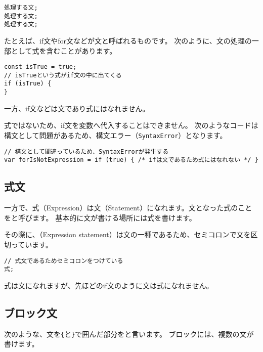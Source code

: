 \begin{lstlisting}
処理する文;
処理する文;
処理する文;
\end{lstlisting}

たとえば、if文やfor文などが文と呼ばれるものです。
次のように、文の処理の一部として式を含むことがあります。

\begin{lstlisting}
const isTrue = true;
// isTrueという式がif文の中に出てくる
if (isTrue) {
}
\end{lstlisting}

一方、if文などは文であり式にはなれません。

式ではないため、if文を変数へ代入することはできません。
次のようなコードは構文として問題があるため、構文エラー（\texttt{SyntaxError}）となります。

\begin{lstlisting}
// 構文として間違っているため、SyntaxErrorが発生する
var forIsNotExpression = if (true) { /* ifは文であるため式にはなれない */ }
\end{lstlisting}

\hypertarget{expression-statement}{%
\subsection{式文}\label{expression-statement}}

一方で、式（Expression）は文（Statement）になれます。文となった式のことを\textbf{}と呼びます。
基本的に文が書ける場所には式を書けます。

その際に、\textbf{}（Expression
statement）は文の一種であるため、セミコロンで文を区切っています。

\begin{lstlisting}
// 式文であるためセミコロンをつけている
式;
\end{lstlisting}

式は文になれますが、先ほどのif文のように文は式になれません。

\hypertarget{block-statement}{%
\subsection{ブロック文}\label{block-statement}}

次のような、文を\texttt{\{}と\texttt{\}}で囲んだ部分を\textbf{}と言います。
ブロックには、複数の文が書けます。

